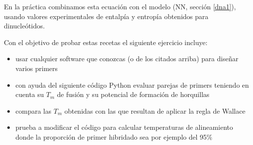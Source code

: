 En la pr\'{a}ctica combinamos esta ecuaci\'{o}n con el modelo  (NN, secci\'{o}n \ref{dna1}), 
usando valores experimentales de entalp\'{i}a y entrop\'{i}a obtenidos para dinucle\'{o}tidos.

Con el objetivo de probar estas recetas el siguiente ejercicio incluye:
\begin{itemize}
\item usar cualquier software que conozcas (o de los citados arriba) para dise\~nar varios primers
\item con ayuda del siguiente c\'{o}digo Python evaluar parejas de primers teniendo en cuenta su $T_{m}$ 
de fusi\'{o}n y su potencial de formaci\'{o}n de horquillas
\item compara las $T_{m}$ obtenidas con las que resultan de aplicar la regla de Wallace
\item prueba a modificar el c\'{o}digo para calcular temperaturas de alineamiento donde la proporci\'{o}n
de primer hibridado sea por ejemplo del 95\%

\end{itemize}
